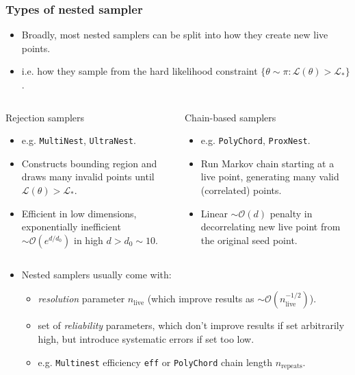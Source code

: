 \documentclass[aspectratio=169]{beamer}
\begin{document}
\begin{frame}
    \frametitle{Types of nested sampler}
    \begin{itemize}
        \item Broadly, most nested samplers can be split into how they create new live points.
        \item i.e. how they sample from the hard likelihood constraint $\{\theta\sim \pi : \mathcal{L}(\theta)>\mathcal{L}_* \}$.
    \end{itemize}
    \vspace{-10pt}
    \begin{columns}[t]
        \begin{block}{Rejection samplers}
            \begin{itemize}
                \item e.g. \texttt{MultiNest}, \texttt{UltraNest}.
                \item Constructs bounding region and draws many invalid points until $\mathcal{L}(\theta)>\mathcal{L}_*$.
                \item Efficient in low dimensions, exponentially inefficient $\sim\mathcal{O}(e^{d/d_0})$ in high $d>d_0\sim10$.
            \end{itemize}
        \end{block}
        \begin{block}{Chain-based samplers}
            \begin{itemize}
                \item e.g. \texttt{PolyChord}, \texttt{ProxNest}.
                \item Run Markov chain starting at a live point, generating many valid (correlated) points.
                \item Linear $\sim\mathcal{O}(d)$ penalty in decorrelating new live point from the original seed point.
            \end{itemize}
        \end{block}
    \end{columns}
    \vspace{5pt}
    \begin{itemize}
        \item Nested samplers usually come with:
            \begin{itemize}
                \item \emph{resolution} parameter $n_\mathrm{live}$ (which improve results as $\sim\mathcal{O}(n_\mathrm{live}^{-1/2})$).
                \item set of \emph{reliability} parameters, which don't improve results if set arbitrarily high, but introduce systematic errors if set too low.
                \item e.g. \texttt{Multinest} efficiency \texttt{eff} or \texttt{PolyChord} chain length $n_\mathrm{repeats}$.
            \end{itemize}
    \end{itemize}
\end{frame}
\end{document}
